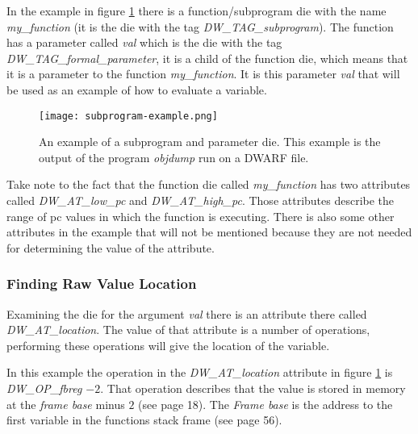 In the example in figure \ref{fig:subprogramexample} there is a function/subprogram \gls{die} with the name \emph{my\_function} (it is the \gls{die} with the tag \emph{DW\_TAG\_subprogram}).
The function has a parameter called \emph{val} which is the \gls{die} with the tag \emph{DW\_TAG\_formal\_parameter}, it is a child of the function \gls{die}, which means that it is a parameter to the function \emph{my\_function}.
It is this parameter \emph{val} that will be used as an example of how to evaluate a variable.


\begin{figure}[h]
	\centering
	\texttt{[image: subprogram-example.png]}
	\caption{An example of a subprogram and parameter \gls{die}. This example is the output of the program \emph{objdump} run on a \gls{DWARF} file.}
	\label{fig:subprogramexample}
\end{figure}


Take note to the fact that the function \gls{die} called \emph{my\_function} has two attributes called \emph{DW\_AT\_low\_pc} and \emph{DW\_AT\_high\_pc}.
Those attributes describe the range of \gls{pc} values in which the function is executing.
There is also some other attributes in the example that will not be mentioned because they are not needed for determining the value of the attribute.




\subsubsection{Finding Raw Value Location}
Examining the \gls{die} for the argument \emph{val} there is an attribute there called \emph{DW\_AT\_location}.
The value of that attribute is a number of operations, performing these operations will give the location of the variable.


In this example the operation in the \emph{DW\_AT\_location} attribute in figure \ref{fig:subprogramexample} is \emph{DW\_OP\_fbreg $-2$}.
That operation describes that the value is stored in memory at the \emph{frame base} minus $2$ (see \cite{dwarf} page 18).
The \emph{Frame base} is the address to the first variable in the functions stack frame (see \cite{dwarf} page 56).


